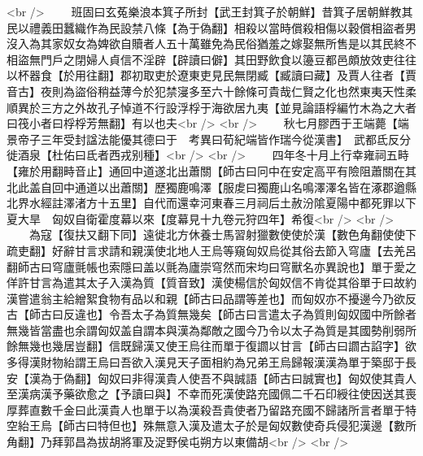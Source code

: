 <br />
　　班固曰玄菟樂浪本箕子所封【武王封箕子於朝鮮】昔箕子居朝鮮教其民以禮義田蠶織作為民設禁八條【為于偽翻】相殺以當時償殺相傷以穀償相盜者男沒入為其家奴女為婢欲自贖者人五十萬雖免為民俗猶羞之嫁娶無所售是以其民終不相盜無門戶之閉婦人貞信不淫辟【辟讀曰僻】其田野飲食以籩豆都邑頗放效吏往往以杯器食【於用往翻】郡初取吏於遼東吏見民無閉臧【臧讀曰藏】及賈人往者【賈音古】夜則為盜俗稍益薄今於犯禁寖多至六十餘條可貴哉仁賢之化也然東夷天性柔順異於三方之外故孔子悼道不行設浮桴于海欲居九夷【並見論語桴編竹木為之大者曰筏小者曰桴桴芳無翻】有以也夫<br />
<br />
　　秋七月膠西于王端薨【端景帝子三年受封諡法能優其德曰于　考異曰荀紀端皆作瑞今從漢書】　武都氐反分徙酒泉【杜佑曰氐者西戎别種】<br />
<br />
　　四年冬十月上行幸雍祠五畤【雍於用翻畤音止】通回中道遂北出蕭關【師古曰冋中在安定高平有險阻蕭關在其北此盖自回中通道以出蕭關】歷獨鹿鳴澤【服䖍曰獨鹿山名鳴澤澤名皆在涿郡遒縣北界水經註澤渚方十五里】自代而還幸河東春三月祠后土赦汾隂夏陽中都死罪以下夏大旱　匈奴自衛霍度幕以來【度幕見十九卷元狩四年】希復<br />
<br />
　　為寇【復扶又翻下同】遠徙北方休養士馬習射獵數使使於漢【數色角翻使使下疏吏翻】好辭甘言求請和親漢使北地人王烏等窺匈奴烏從其俗去節入穹廬【去羌呂翻師古曰穹廬氈帳也索隱曰盖以氈為廬崇穹然而宋均曰穹獸名亦異說也】單于愛之佯許甘言為遣其太子入漢為質【質音致】漢使楊信於匈奴信不肯從其俗單于曰故約漢嘗遣翁主給繒絮食物有品以和親【師古曰品謂等差也】而匈奴亦不擾邊今乃欲反古【師古曰反違也】令吾太子為質無幾矣【師古曰言遣太子為質則匈奴國中所餘者無幾皆當盡也余謂匈奴盖自謂本與漢為鄰敵之國今乃令以太子為質是其國勢削弱所餘無幾也幾居豈翻】信既歸漢又使王烏往而單于復讇以甘言【師古曰讇古諂字】欲多得漢財物紿謂王烏曰吾欲入漢見天子面相約為兄弟王烏歸報漢漢為單于築邸于長安【漢為于偽翻】匈奴曰非得漢貴人使吾不與誠語【師古曰誠實也】匈奴使其貴人至漢病漢予藥欲愈之【予讀曰與】不幸而死漢使路充國佩二千石印綬往使因送其喪厚葬直數千金曰此漢貴人也單于以為漢殺吾貴使者乃留路充國不歸諸所言者單于特空紿王烏【師古曰特但也】殊無意入漢及遣太子於是匈奴數使奇兵侵犯漢邊【數所角翻】乃拜郭昌為拔胡將軍及浞野侯屯朔方以東備胡<br />
<br />
